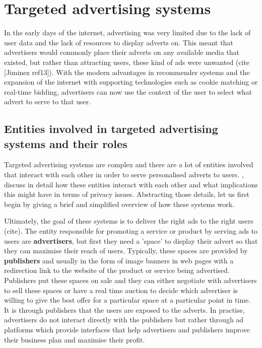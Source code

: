 \documentclass{l4proj}
\begin{document}
\section{Targeted advertising systems}
\label{targeted}
In the early days of the internet, advertising was very limited due to the lack of user data and the lack of resources to display adverts on. This meant that advertisers would commonly place their adverts on any available media that existed, but rather than attracting users, these kind of ads were unwanted (cite [Jiminez ref13]). With the modern advantages in recommender systems and the expansion of the internet with supporting technologies such as cookie matching or real-time bidding, advertisers can now use the context of the user to select what advert to serve to that user.    

\subsection{Entities involved in targeted advertising systems and their roles}
Targeted advertising systems are complex and there are a lot of entities involved that interact with each other in order to serve personalised adverts to users. \cite{Estrada-Jimenez2017}, discuss in detail how these entities interact with each other and what implications this might have in terms of privacy issues. Abstracting those details, let us first begin by giving a brief and simplified overview of how these systems work. 

Ultimately, the goal of these systems is to deliver the right ads to the right users (cite). The entity responsible for promoting a service or product by serving ads to users are \textbf{advertisers}, but first they need a 'space' to display their advert so that they can maximise their reach of users. Typically, these spaces are provided by \textbf{publishers} and usually in the form of image banners in web pages with a redirection link to the website of the product or service being advertised. Publishers put these spaces on sale and they can either negotiate with advertisers to sell these spaces or have a real time auction to decide which advertiser is willing to give the best offer for a particular space at a particular point in time. It is through publishers that the users are exposed to the adverts. In practise, advertisers do not interact directly with the publishers but rather through ad platforms which provide interfaces that help advertisers and publishers improve their business plan and maximise their profit.
\end{document}
